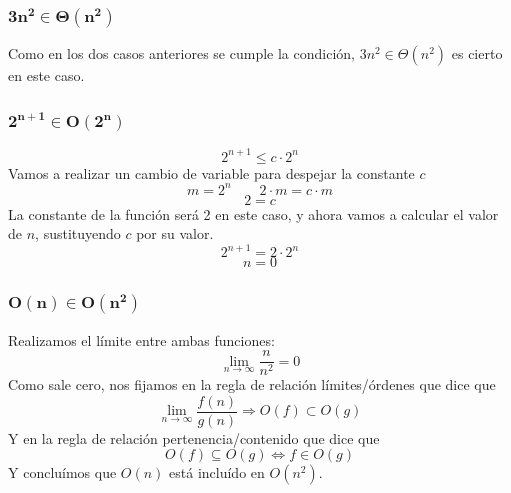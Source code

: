 \documentclass[10pt,a4paper,spanish]{report}
\theoremstyle{definition}
\theoremstyle{remark}
\begin{document}
\begin{multicols}{2}
\subsubsection{$\mathbf{3n^2 \in \Theta(n^2)}$}


Como en los dos casos anteriores se cumple la condición, $3n^2 \in \Theta(n^2)$ es cierto en este caso.

\subsubsection{$\mathbf{2^{n+1} \in O(2^n)}$}

\begin{displaymath}
2^{n+1} \leq c \cdot 2^{n}
\end{displaymath}
Vamos a realizar un cambio de variable para despejar la constante $c$
\begin{displaymath}
m = 2^n \qquad 2 \cdot m = c \cdot m
\end{displaymath}
\begin{displaymath}
2 = c
\end{displaymath}
La constante de la función será 2 en este caso, y ahora vamos a calcular el valor de $n$, sustituyendo $c$ por su valor.
\begin{displaymath}
2^{n+1} = 2 \cdot 2^n
\end{displaymath}
\begin{displaymath}
n = 0
\end{displaymath}

\subsubsection{$\mathbf{O(n) \in O(n^2)}$}

Realizamos el límite entre ambas funciones:
\begin{displaymath}
\lim_{n \rightarrow \infty} \frac{n}{n^2} = 0
\end{displaymath}
Como sale cero, nos fijamos en la regla de relación límites/órdenes que dice que
\begin{displaymath}
\lim_{n \rightarrow \infty} \frac{f(n)}{g(n)} \Longrightarrow O(f) \subset O(g)
\end{displaymath}
Y en la regla de relación pertenencia/contenido que dice que
\begin{displaymath}
O(f) \subseteq O(g) \Longleftrightarrow f \in O(g)
\end{displaymath}
Y concluímos que $O(n)$ está incluído en $O(n^2)$.


\end{multicols}
\end{document}
